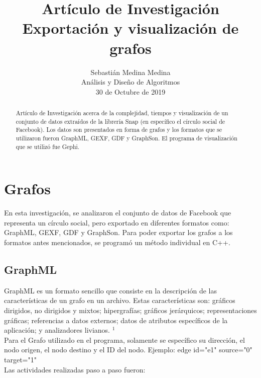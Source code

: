 \documentclass[book, 16 pt, conference]{ieeeconf}
\title{\LARGE \bf
Artículo de Investigación\\
Exportación y visualización de grafos
}
\author{Sebastián Medina Medina\\
Análisis y Diseño de Algoritmos\\
30 de Octubre de 2019
}
\begin{document}
\maketitle
\thispagestyle{empty}
\pagestyle{empty}


\begin{abstract}

Artículo de Investigación acerca de la complejidad, tiempos y visualización de un conjunto de datos extraídos de la librería Snap (en específico el círculo social de Facebook). Los datos son presentados en forma de grafos y los formatos que se utilizaron fueron GraphML, GEXF, GDF y GraphSon. El programa de visualización que se utilizó fue Gephi.
 
\end{abstract}

\section{Grafos}

En esta investigación, se analizaron el conjunto de datos de Facebook que representa un círculo social, pero exportado en diferentes formatos como: GraphML, GEXF, GDF y GraphSon. Para poder exportar los grafos a los formatos antes mencionados, se programó un método individual en C++.

\subsection{GraphML}

GraphML es un formato sencillo que consiste en la descripción de las características de un grafo en un archivo. Estas características son: gráficos dirigidos, no dirigidos y mixtos; hipergrafías; gráficos jerárquicos; representaciones gráficas; referencias a datos externos; datos de atributos específicos de la aplicación; y analizadores livianos. $^{1}$  \\

Para el Grafo utilizado en el programa, solamente se específico su dirección, el nodo origen, el nodo destino y el ID del nodo. Ejemplo: edge id="e1" source="0" target="1"\\

Las actividades realizadas paso a paso fueron: \\
\end{document}
